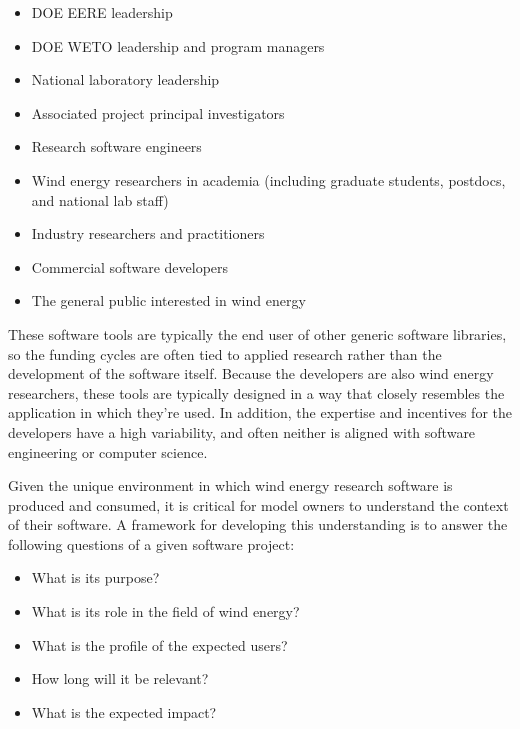 \documentclass[]{nlr}
\begin{document}
\begin{itemize}
\item DOE EERE leadership

\item DOE WETO leadership and program managers

\item National laboratory leadership

\item Associated project principal investigators

\item Research software engineers

\item Wind energy researchers in academia
(including graduate students, postdocs, and national lab staff)

\item Industry researchers and practitioners

\item Commercial software developers

\item The general public interested in wind energy

\end{itemize}

These software tools are typically the end user of other generic software libraries, so
the funding cycles are often tied to applied research rather than the development of the
software itself. Because the developers are also wind energy researchers, these tools are
typically designed in a way that closely resembles the application in which they’re used.
In addition, the expertise and incentives for the developers have a high variability, and
often neither is aligned with software engineering or computer science.

Given the unique environment in which wind energy research software is produced and consumed,
it is critical for model owners to understand the context of their software. A framework
for developing this understanding is to answer the following questions of a given software project:

\begin{itemize}
\item What is its purpose?

\item What is its role in the field of wind energy?

\item What is the profile of the expected users?

\item How long will it be relevant?

\item What is the expected impact?

\end{itemize}
\end{document}
